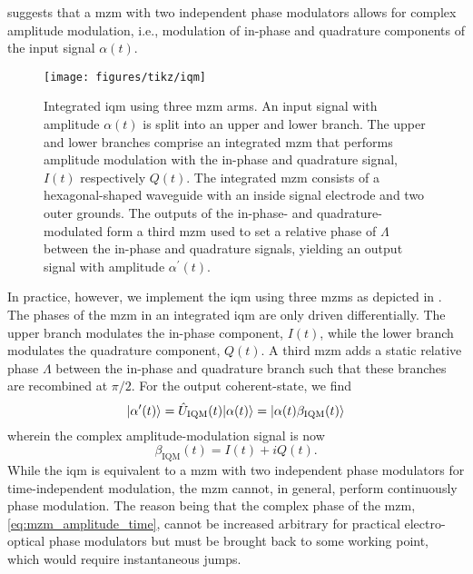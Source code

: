  suggests that a \gls{mzm} with two independent phase modulators allows for complex amplitude modulation, i.e.,  modulation of in-phase and quadrature components of the input signal $\alpha(t)$.
\begin{figure}[htb]
    \centering
    \texttt{[image: figures/tikz/iqm]}
    \caption{Integrated \gls{iqm} using three \gls{mzm} arms. An input signal with amplitude $\alpha(t)$ is split into an upper and lower branch. The upper and lower branches comprise an integrated \gls{mzm} that performs amplitude modulation with the in-phase and quadrature signal, $I(t)$ respectively $Q(t)$. The integrated \gls{mzm} consists of a hexagonal-shaped waveguide with an inside signal electrode and two outer grounds. The outputs of the in-phase- and quadrature-modulated form a third \gls{mzm} used to set a relative phase of $\Lambda$ between the in-phase and quadrature signals, yielding an output signal with amplitude $\alpha^\prime(t)$.}\label{fig:iqm}
\end{figure}
In practice, however, we implement the \gls{iqm} using three \gls{mzm}s as depicted in .
The phases of the \gls{mzm} in an integrated \gls{iqm} are only driven differentially.
The upper branch modulates the in-phase component, $I(t)$, while the lower branch modulates the quadrature component, $Q(t)$.
A third \gls{mzm} adds a static relative phase $\Lambda$ between the in-phase and quadrature branch such that these branches are recombined at $\pi/2$.
For the output coherent-state, we find
\begin{equation}
	\ket*{\alpha^\prime(t)}
	=
	\hat{U}_\text{IQM}(t)
	\ket*{\alpha(t)}
	=
	\ket*{\alpha(t)\beta_\text{IQM}(t)}
\end{equation}
wherein the complex amplitude-modulation signal is now
\begin{equation}
	\beta_\text{IQM}(t)
	=
	I(t)
	+
	iQ(t)
	\label{eq:iqm_modulation}
	.
\end{equation}
While the \gls{iqm} is equivalent to a \gls{mzm} with two independent phase modulators for time-independent modulation, the \gls{mzm} cannot, in general, perform continuously phase modulation.
The reason being that the complex phase of the \gls{mzm}, \cref{eq:mzm_amplitude_time}, cannot be increased arbitrary for practical electro-optical phase modulators but must be brought back to some working point, which would require instantaneous jumps.